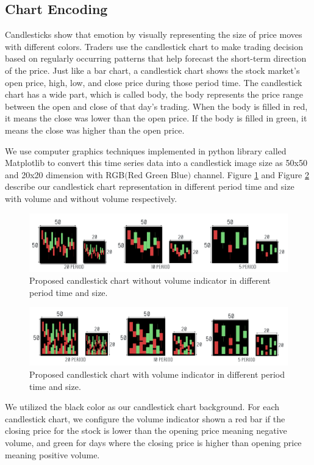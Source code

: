 \documentclass[10pt,twocolumn]{article}
\begin{document}
\subsection{Chart Encoding}
Candlesticks show that emotion by visually representing the size of price moves with different colors. Traders use the candlestick chart to make trading decision based on regularly occurring patterns that help forecast the short-term direction of the price. Just like a bar chart, a candlestick chart shows the stock market’s open price, high, low, and close price during those period time. The candlestick chart has a wide part, which is called body, the body represents the price range between the open and close of that day’s trading. When the body is filled in red, it means the close was lower than the open price. If the body is filled in green, it means the close was higher than the open price. 
\par
We use computer graphics techniques implemented in python library called Matplotlib\cite{hunter2007matplotlib} to convert this time series data into a candlestick image size as 50x50 and 20x20 dimension with RGB$($Red Green Blue$)$ channel.
Figure \ref{fig:candlewithoutvolume} and Figure \ref{fig:candlewithvolume} describe our candlestick chart representation in different period time and size with volume and without volume respectively.
\begin{figure}
  \includegraphics[width=\linewidth]{figures/candlewithoutvolume.png}
  \caption{Proposed candlestick chart without volume indicator in different period time and size.}
  \label{fig:candlewithoutvolume}
\end{figure}
\begin{figure}
  \includegraphics[width=\linewidth]{figures/candlewithvolume.png}
  \caption{Proposed candlestick chart with volume indicator in different period time and size.}
  \label{fig:candlewithvolume}
\end{figure}
\par
We utilized the black color as our candlestick chart background. For each candlestick chart, we configure the volume indicator shown a red bar if the closing price for the stock is lower than the opening price meaning negative volume, and green for days where the closing price is higher than opening price meaning positive volume.
\end{document}
